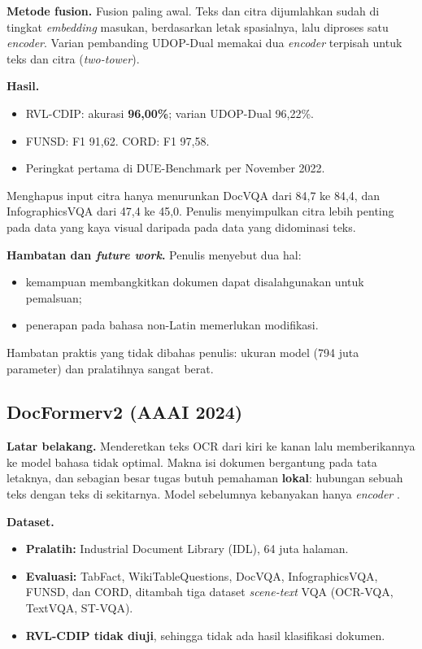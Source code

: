 \textbf{Metode fusion.} Fusion paling awal. Teks dan citra dijumlahkan sudah di tingkat
\textit{embedding} masukan, berdasarkan letak spasialnya, lalu diproses satu
\textit{encoder}. Varian pembanding UDOP-Dual memakai dua \textit{encoder} terpisah untuk
teks dan citra (\textit{two-tower}).

\textbf{Hasil.}
\begin{itemize}
  \item RVL-CDIP: akurasi \textbf{96,00\%}; varian UDOP-Dual 96,22\%.
  \item FUNSD: F1 91,62. CORD: F1 97,58.
  \item Peringkat pertama di DUE-Benchmark per November 2022.
\end{itemize}

Menghapus input citra hanya menurunkan DocVQA dari 84,7 ke 84,4, dan InfographicsVQA dari
47,4 ke 45,0. Penulis menyimpulkan citra lebih penting pada data yang kaya visual daripada
pada data yang didominasi teks.

\textbf{Hambatan dan \textit{future work}.} Penulis menyebut dua hal:
\begin{itemize}
  \item kemampuan membangkitkan dokumen dapat disalahgunakan untuk pemalsuan;
  \item penerapan pada bahasa non-Latin memerlukan modifikasi.
\end{itemize}
Hambatan praktis yang tidak dibahas penulis: ukuran model (794 juta parameter) dan
pralatihnya sangat berat.

\subsection{DocFormerv2 (AAAI 2024)}\label{sec:docformerv2}

\textbf{Latar belakang.} Menderetkan teks OCR dari kiri ke kanan lalu memberikannya ke
model bahasa tidak optimal. Makna isi dokumen bergantung pada tata letaknya, dan sebagian
besar tugas butuh pemahaman \textbf{lokal}: hubungan sebuah teks dengan teks di
sekitarnya. Model sebelumnya kebanyakan hanya \textit{encoder}
\parencite{appalaraju2024docformerv2}.

\textbf{Dataset.}
\begin{itemize}
  \item \textbf{Pralatih:} Industrial Document Library (IDL), 64 juta halaman.
  \item \textbf{Evaluasi:} TabFact, WikiTableQuestions, DocVQA, InfographicsVQA, FUNSD, dan
  CORD, ditambah tiga dataset \textit{scene-text} VQA (OCR-VQA, TextVQA, ST-VQA).
  \item \textbf{RVL-CDIP tidak diuji}, sehingga tidak ada hasil klasifikasi dokumen.
\end{itemize}


